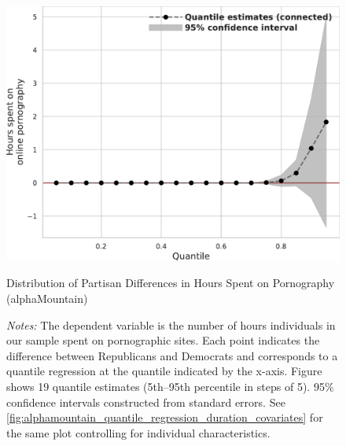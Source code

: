 \documentclass[12pt,twoside]{article}
\begin{document}
\begin{figure}[t]
	\centering
	\includegraphics[width=.6\linewidth]{figs/alphamountain_quantile_reg_duration_adult.pdf}
	\caption{Distribution of Partisan Differences in Hours Spent on Pornography (alphaMountain)}
	\caption*{\footnotesize \emph{Notes:} 
		The dependent variable is the number of hours individuals in our sample spent on pornographic sites.
		Each point indicates the difference between Republicans and Democrats and corresponds to a quantile regression at the quantile indicated by the x-axis.
  Figure shows 19 quantile estimates (5th--95th percentile in steps of 5).
		95\% confidence intervals constructed from standard errors.
		See \cref{fig:alphamountain_quantile_regression_duration_covariates} for the same plot controlling for individual characteristics.
	}
	\label{fig:alphamountain_quantile_regression_duration}
\end{figure}
\end{document}
